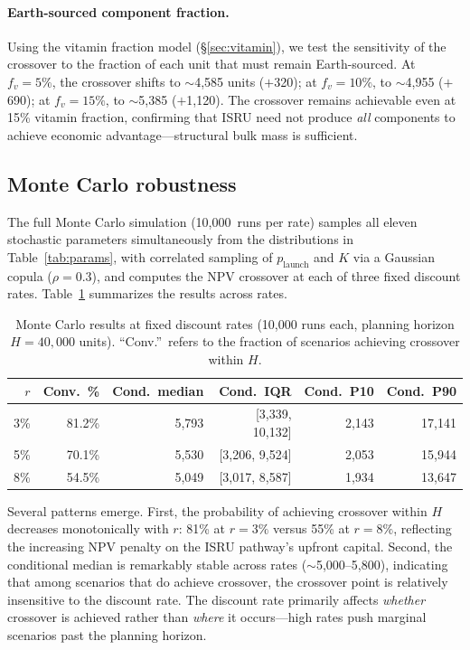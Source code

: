 \documentclass[preprint,12pt]{elsarticle}
\begin{document}
\paragraph{Earth-sourced component fraction.} Using the vitamin fraction model (\S\ref{sec:vitamin}), we test the sensitivity of the crossover to the fraction of each unit that must remain Earth-sourced. At $f_v = 5\%$, the crossover shifts to $\sim$4{,}585 units ($+$320); at $f_v = 10\%$, to $\sim$4{,}955 ($+$690); at $f_v = 15\%$, to $\sim$5{,}385 ($+$1{,}120). The crossover remains achievable even at 15\% vitamin fraction, confirming that ISRU need not produce \emph{all} components to achieve economic advantage---structural bulk mass is sufficient.

\subsection{Monte Carlo robustness}
\label{sec:mc_robustness}

The full Monte Carlo simulation (10{,}000~runs per rate) samples all eleven stochastic parameters simultaneously from the distributions in Table~\ref{tab:params}, with correlated sampling of $p_{\mathrm{launch}}$ and $K$ via a Gaussian copula ($\rho = 0.3$), and computes the NPV crossover at each of three fixed discount rates. Table~\ref{tab:mc_summary} summarizes the results across rates.

\begin{table}[htbp]
\centering
\caption{Monte Carlo results at fixed discount rates (10{,}000 runs each, planning horizon $H = 40{,}000$ units). ``Conv.''\ refers to the fraction of scenarios achieving crossover within $H$.}
\label{tab:mc_summary}
\small
\begin{tabular}{@{}rrrrrr@{}}
\toprule
$r$ & Conv.\ \% & Cond.\ median & Cond.\ IQR & Cond.\ P10 & Cond.\ P90 \\
\midrule
3\%  & 81.2\% & 5{,}793 & [3{,}339, 10{,}132] & 2{,}143 & 17{,}141 \\
5\%  & 70.1\% & 5{,}530 & [3{,}206, 9{,}524]  & 2{,}053 & 15{,}944 \\
8\%  & 54.5\% & 5{,}049 & [3{,}017, 8{,}587]  & 1{,}934 & 13{,}647 \\
\bottomrule
\end{tabular}
\end{table}

Several patterns emerge. First, the probability of achieving crossover within $H$ decreases monotonically with $r$: 81\% at $r = 3\%$ versus 55\% at $r = 8\%$, reflecting the increasing NPV penalty on the ISRU pathway's upfront capital. Second, the conditional median is remarkably stable across rates ($\sim$5{,}000--5{,}800), indicating that among scenarios that do achieve crossover, the crossover point is relatively insensitive to the discount rate. The discount rate primarily affects \emph{whether} crossover is achieved rather than \emph{where} it occurs---high rates push marginal scenarios past the planning horizon.
\end{document}

